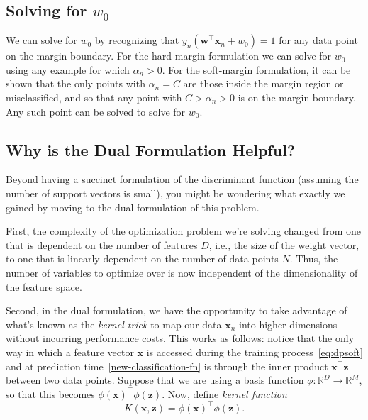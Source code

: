 
\subsection*{Solving for $w_0$}

We can solve for $w_0$ by recognizing that $y_n({\mathbf w}^\top {\mathbf x}_n+w_0)=1$ for any data point on the margin boundary. For the hard-margin formulation we can solve for $w_0$ using any example for which $\alpha_n>0$. For the soft-margin formulation, it can be shown that the only points with $\alpha_n=C$ are those inside the margin region or misclassified, and so that any point with $C>\alpha_n>0$ is on the margin boundary. Any such point can be solved to solve for $w_0$.


\subsection{Why is the Dual Formulation Helpful?}

Beyond having a succinct formulation of the discriminant function (assuming the number of support vectors is small), you might be wondering what exactly we gained by moving to the dual formulation of this problem.

First, the complexity of the optimization problem we're solving changed from one that is dependent on the number of features $D$, i.e., the size of the weight vector, to one that is linearly dependent on the number of data points $N$. Thus, the number of variables to optimize over is now independent of the dimensionality of the feature space.

Second, in the dual formulation, we have the opportunity to take advantage of what's known as the \textit{kernel trick} to map our data $\textbf{x}_{n}$ into higher dimensions without incurring performance costs. This works as follows: notice that the only way in which a feature vector ${\mathbf x}$ is accessed during the training process~\eqref{eq:dpsoft} and at prediction time~\eqref{new-classification-fn} is through the inner product $\textbf{x}^\top\textbf{z}$ between two data points. Suppose that we are using a basis function $\phi: \mathbb{R}^D\to\mathbb{R}^M$, so that this becomes $\phi(\textbf{x})^\top \phi(\textbf{z})$. Now, define {\em kernel function}
%
\begin{equation} \label{kernel-fn}
	K(\textbf{x}, \textbf{z}) = \phi(\textbf{x})^\top \phi(\textbf{z}).
      \end{equation}

